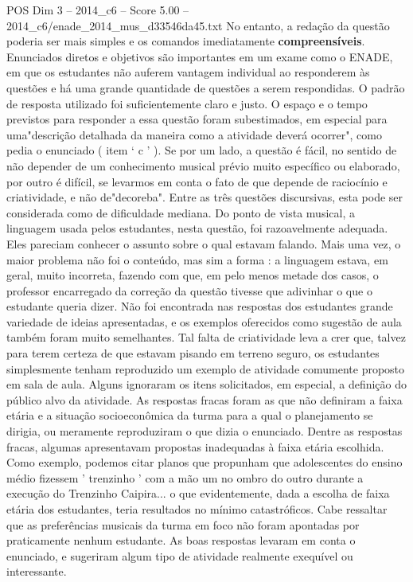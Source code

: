 \begin{textsample}{POS Dim 3 – 2014\_c6 – Score 5.00 – 2014\_c6/enade\_2014\_mus\_d33546da45.txt}
No entanto, a redação da questão poderia ser mais simples e os comandos imediatamente \textbf{compreensíveis}.
Enunciados diretos e objetivos são importantes em um exame como o ENADE, em que os estudantes não auferem vantagem individual ao responderem às questões e há uma grande quantidade de questões a serem respondidas.
O padrão de resposta utilizado foi suficientemente claro e justo.
O espaço e o tempo previstos para responder a essa questão foram subestimados, em especial para uma"descrição detalhada da maneira como a atividade deverá ocorrer", como pedia o enunciado ( item ‘ c ' ).
Se por um lado, a questão é fácil, no sentido de não depender de um conhecimento musical prévio muito específico ou elaborado, por outro é difícil, se levarmos em conta o fato de que depende de raciocínio e criatividade, e não de"decoreba".
Entre as três questões discursivas, esta pode ser considerada como de dificuldade mediana.
Do ponto de vista musical, a linguagem usada pelos estudantes, nesta questão, foi razoavelmente adequada.
Eles pareciam conhecer o assunto sobre o qual estavam falando.
Mais uma vez, o maior problema não foi o conteúdo, mas sim a forma : a linguagem estava, em geral, muito incorreta, fazendo com que, em pelo menos metade dos casos, o professor encarregado da correção da questão tivesse que adivinhar o que o estudante queria dizer.
Não foi encontrada nas respostas dos estudantes grande variedade de ideias apresentadas, e os exemplos oferecidos como sugestão de aula também foram muito semelhantes.
Tal falta de criatividade leva a crer que, talvez para terem certeza de que estavam pisando em terreno seguro, os estudantes simplesmente tenham reproduzido um exemplo de atividade comumente proposto em sala de aula.
Alguns ignoraram os itens solicitados, em especial, a definição do público alvo da atividade.
As respostas fracas foram as que não definiram a faixa etária e a situação socioeconômica da turma para a qual o planejamento se dirigia, ou meramente reproduziram o que dizia o enunciado.
Dentre as respostas fracas, algumas apresentavam propostas inadequadas à faixa etária escolhida.
Como exemplo, podemos citar planos que propunham que adolescentes do ensino médio fizessem ' trenzinho ' com a mão um no ombro do outro durante a execução do Trenzinho Caipira... o que evidentemente, dada a escolha de faixa etária dos estudantes, teria resultados no mínimo catastróficos.
Cabe ressaltar que as preferências musicais da turma em foco não foram apontadas por praticamente nenhum estudante.
As boas respostas levaram em conta o enunciado, e sugeriram algum tipo de atividade realmente exequível ou interessante.

\end{textsample}
